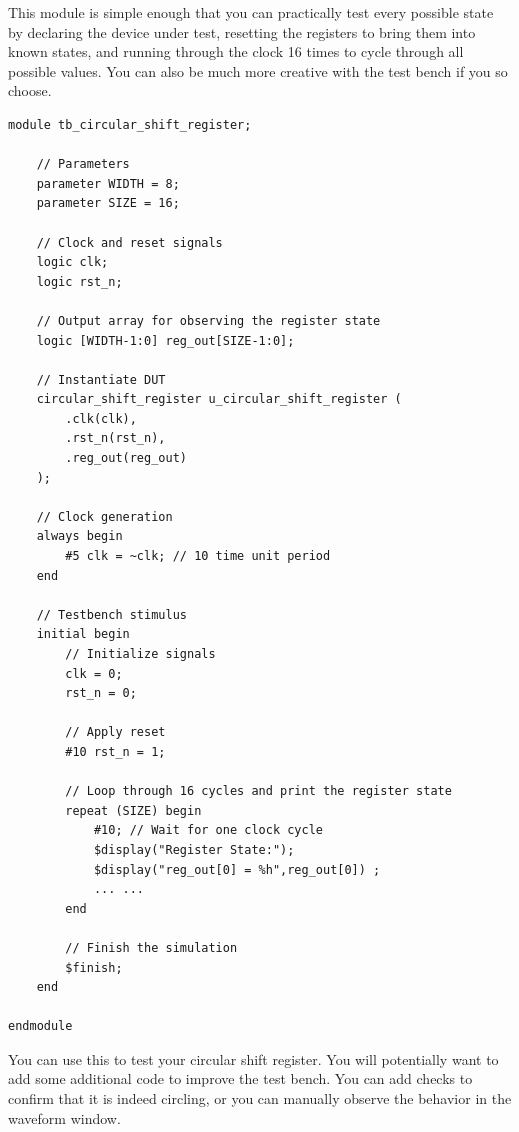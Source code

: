 This module is simple enough that you can practically test every possible state by declaring the device under test, resetting the registers to bring them into known states, and running through the clock 16 times to cycle through all possible values. You can also be much more creative with the test bench if you so choose.

\begin{lstlisting}
module tb_circular_shift_register;

    // Parameters
    parameter WIDTH = 8;
    parameter SIZE = 16;

    // Clock and reset signals
    logic clk;
    logic rst_n;

    // Output array for observing the register state
    logic [WIDTH-1:0] reg_out[SIZE-1:0];

    // Instantiate DUT
    circular_shift_register u_circular_shift_register (
        .clk(clk),
        .rst_n(rst_n),
        .reg_out(reg_out)
    );

    // Clock generation
    always begin
        #5 clk = ~clk; // 10 time unit period
    end

    // Testbench stimulus
    initial begin
        // Initialize signals
        clk = 0;
        rst_n = 0;
        
        // Apply reset
        #10 rst_n = 1;

        // Loop through 16 cycles and print the register state
        repeat (SIZE) begin
            #10; // Wait for one clock cycle
            $display("Register State:");
            $display("reg_out[0] = %h",reg_out[0]) ;
            ... ...
        end

        // Finish the simulation
        $finish;
    end

endmodule
\end{lstlisting}
You can use this to test your circular shift register. You will potentially want to add some additional code to improve the test bench. You can add checks to confirm that it is indeed circling, or you can manually observe the behavior in the waveform window. 
